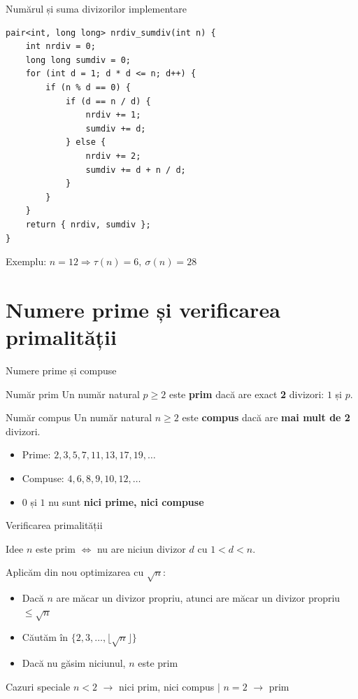 \documentclass[10pt]{beamer}
\begin{document}
\begin{frame}[fragile]{Numărul și suma divizorilor \textemdash{} implementare}
  \begin{lstlisting}
pair<int, long long> nrdiv_sumdiv(int n) {
    int nrdiv = 0;
    long long sumdiv = 0;
    for (int d = 1; d * d <= n; d++) {
        if (n % d == 0) {
            if (d == n / d) {
                nrdiv += 1;
                sumdiv += d;
            } else {
                nrdiv += 2;
                sumdiv += d + n / d;
            }
        }
    }
    return { nrdiv, sumdiv };
}
  \end{lstlisting}
  Exemplu: $n=12 \Rightarrow \tau(n)=6,\ \sigma(n)=28$
\end{frame}

\section{Numere prime și verificarea primalității}

\begin{frame}{Numere prime și compuse}
  \begin{block}{Număr prim}
    Un număr natural $p \geq 2$ este \textbf{prim} dacă are exact \textbf{2} divizori: $1$ și $p$.
  \end{block}
  \begin{block}{Număr compus}
    Un număr natural $n \geq 2$ este \textbf{compus} dacă are \textbf{mai mult de 2} divizori.
  \end{block}
  \begin{itemize}
    \item Prime: $2, 3, 5, 7, 11, 13, 17, 19, \ldots$
    \item Compuse: $4, 6, 8, 9, 10, 12, \ldots$
    \item $0$ și $1$ nu sunt \textbf{nici prime, nici compuse}
  \end{itemize}
\end{frame}

\begin{frame}{Verificarea primalității}
  \begin{block}{Idee}
    $n$ este prim $\Leftrightarrow$ nu are niciun divizor $d$ cu $1 < d < n$.
  \end{block}
  Aplicăm din nou optimizarea cu $\sqrt{n}$:
  \begin{itemize}
    \item Dacă $n$ are măcar un divizor propriu, atunci are măcar un divizor propriu $\leq \sqrt{n}$
    \item Căutăm în $\{2, 3, \ldots, \lfloor\sqrt{n}\rfloor\}$
    \item Dacă nu găsim niciunul, $n$ este prim
  \end{itemize}
  \begin{alertblock}{Cazuri speciale}
    $n < 2$ $\rightarrow$ nici prim, nici compus \quad $|$ \quad $n = 2$ $\rightarrow$ prim
  \end{alertblock}
\end{frame}
\end{document}
